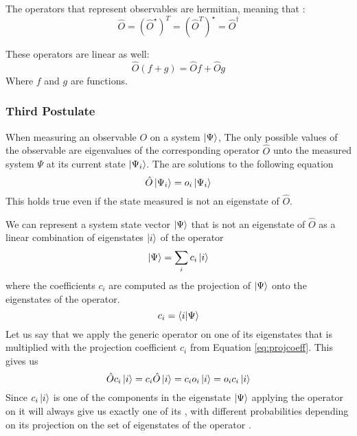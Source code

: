 \documentclass[../master_thesis.tex]{subfiles}
\begin{document}
The operators that represent observables are hermitian, meaning that
\cite{Cohen:1973}:
\begin{equation}
  \hat{O} = (\hat{O}^{\star})^T = (\hat{O}^T)^{\star} = \hat{O}^{\dagger}
\end{equation}

These operators are linear as well:
\begin{equation}
    \hat{O}(f + g) = \hat{O}f + \hat{O}g\label{eq:oplinearity}
\end{equation}
Where $f$ and $g$ are functions.

\subsubsection{Third Postulate}
When measuring an observable $O$ on a system $\ket{\Psi}$, The only possible
values of the observable are eigenvalues of the corresponding operator $\hat{O}$
unto the measured system $\Psi$ at its current state $\ket{\Psi_i}$. The \eivals
are solutions to the following equation \cite{Cohen:1973}
\begin{equation}
  \hat{O}\ket{\Psi_i} = o_i \ket{\Psi_i}
\end{equation}
This holds true even if the state measured is not an eigenstate of $\hat{O}$.

We can represent a system state vector $\ket{\Psi}$ that is not an eigenstate
of $\hat{O}$ as a linear combination of eigenstates $\ket{i}$ of the operator
\begin{equation}
  \ket{\Psi} = \sum_i c_i \ket{i}
\end{equation}
where the coefficients $c_i$ are computed as the projection of $\ket{\Psi}$ onto
the eigenstates of the operator.
\begin{equation}\label{eq:projcoeff}
  c_i = \braket{i|\Psi}
\end{equation}
Let us say that we apply the generic operator on one of its eigenstates that
is multiplied with the projection coefficient $c_i$ from Equation \ref{eq:projcoeff}.
This gives us
\begin{equation}
  \hat{O}c_i\ket{i} = c_i\hat{O}\ket{i} = c_i o_i\ket{i} = o_i c_i\ket{i}
\end{equation}
Since $c_i\ket{i}$ is one of the components in the eigenstate $\ket{\Psi}$
applying the operator on it will always give us exactly one of its \eivals, with
different probabilities  depending on its projection on the set of eigenstates
of the operator \cite{Cohen:1973}.
\end{document}
